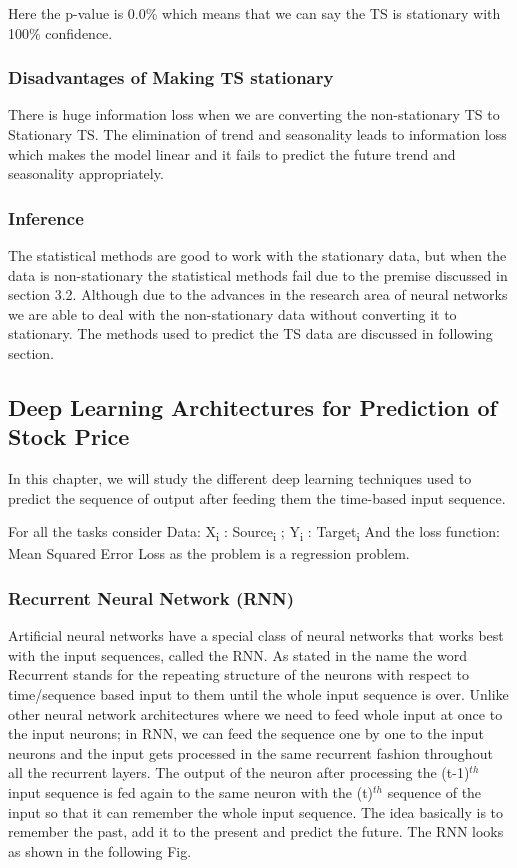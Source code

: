 			Here the p-value is 0.0\% which means that we can say the TS is stationary with 100\% confidence.


	\subsubsection{Disadvantages of Making TS stationary}

		There is huge information loss when we are converting the non-stationary TS to Stationary TS. The elimination of trend and seasonality leads to information loss which makes the model linear and it fails to predict the future trend and seasonality appropriately. 

	\subsubsection{Inference}

		The statistical methods are good to work with the stationary data, but when the data is non-stationary the statistical methods fail due to the premise discussed in section 3.2. Although due to the advances in the research area of neural networks we are able to deal with the non-stationary data without converting it to stationary. The methods used to predict the TS data are discussed in following section.


\subsection{Deep Learning Architectures for Prediction of Stock Price}

In this chapter, we will study the different deep learning techniques used to predict the sequence of output after feeding them the time-based input sequence. 

For all the tasks consider
Data: {X\textsubscript{i} : Source\textsubscript{i} ; Y\textsubscript{i} : Target\textsubscript{i} }
And the loss function: Mean Squared Error Loss as the problem is a regression problem. 

\subsubsection{Recurrent Neural Network (RNN)}

Artificial neural networks have a special class of neural networks that works best with the input sequences, called the RNN. As stated in the name the word Recurrent stands for the repeating structure of the neurons with respect to time/sequence based input to them until the whole input sequence is over. Unlike other neural network architectures where we need to feed whole input at once to the input neurons; in RNN, we can feed the sequence one by one to the input neurons and the input gets processed in the same recurrent fashion throughout all the recurrent layers. The output of the neuron after processing the (t-1)$^{th}$ input sequence is fed again to the same neuron with the (t)$^{th}$ sequence of the input so that it can remember the whole input sequence. The idea basically is to remember the past, add it to the present and predict the future. The RNN looks as shown in the following Fig.

